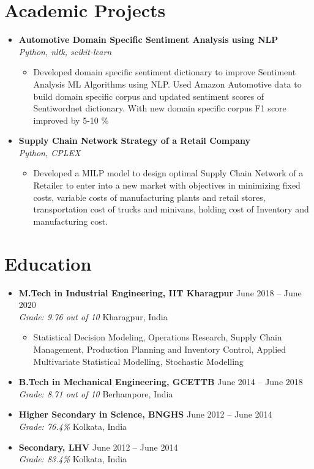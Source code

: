 \documentclass[a4paper,10pt]{article}
\newcommand{\resumeItem}[1]{\item\small{#1}}
\newcommand{\resumeSubheading}[4]{
  \vspace{1pt}\item
    \textbf{#1} \hfill {#2} \\
    \emph{#3} \hfill {#4} \\
}
\begin{document}
\section*{Academic Projects}
\begin{itemize}
    \resumeSubheading
      {Automotive Domain Specific Sentiment Analysis using NLP}{}
      {Python, nltk, scikit-learn}{}
      \begin{itemize}
        \resumeItem{
          Developed domain specific sentiment dictionary to improve Sentiment Analysis ML Algorithms using NLP. Used
          Amazon Automotive data to build domain specific corpus and updated sentiment scores of Sentiwordnet
          dictionary. With new domain specific corpus F1 score improved by 5-10 \%
        }
      \end{itemize}

    \resumeSubheading
      {Supply Chain Network Strategy of a Retail Company}{}
      {Python, CPLEX}{}
      \begin{itemize}
      \resumeItem{
        Developed a MILP model to design optimal Supply Chain Network of a Retailer to enter into a new market with objectives 
        in minimizing fixed costs, variable costs of manufacturing plants and retail stores, transportation cost of 
        trucks and minivans, holding cost of Inventory and manufacturing cost.
      }
      \end{itemize}

\end{itemize}

\section*{Education}
\begin{itemize}
  \resumeSubheading
    {M.Tech in Industrial Engineering, IIT Kharagpur}{June 2018 -- June 2020}
    {Grade: 9.76 out of 10}{Kharagpur, India}
    \begin{itemize}
      \resumeItem{
        Statistical Decision Modeling, Operations Research, Supply Chain Management, Production Planning and Inventory Control, 
        Applied Multivariate Statistical Modelling, Stochastic Modelling
      }
    \end{itemize}
\end{itemize}
\begin{itemize}
  \resumeSubheading
    {B.Tech in Mechanical Engineering, GCETTB}{June 2014 -- June 2018}
    {Grade: 8.71 out of 10}{Berhampore, India}
\end{itemize}
\begin{itemize}
  \resumeSubheading
    {Higher Secondary in Science, BNGHS}{June 2012 -- June 2014}
    {Grade: 76.4\%}{Kolkata, India}
\end{itemize}
\begin{itemize}
  \resumeSubheading
    {Secondary, LHV}{June 2012 -- June 2014}
    {Grade: 83.4\%}{Kolkata, India}
\end{itemize}
\end{document}
